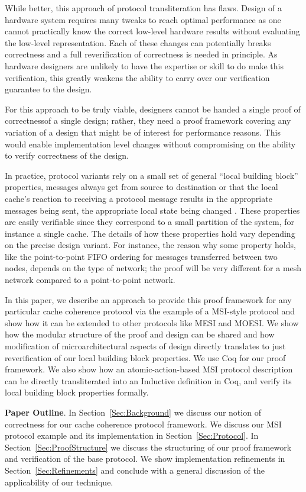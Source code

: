 While better, this approach of protocol transliteration has
flaws. Design of a hardware system requires many tweaks to reach
optimal performance as one cannot practically know the correct
low-level hardware results without evaluating the low-level
representation.  Each of these changes can potentially breaks
correctness and a full reverification of correctness is needed in
principle. As hardware designers are unlikely to have the expertise or
skill to do make this verification, this greatly weakens the ability
to carry over our verification guarantee to the design.

For this approach to be truly viable, designers cannot be handed a
single proof of correctnessof a single design; rather, they need a
proof framework covering any variation of a design that might be of
interest for performance reasons. This would enable implementation
level changes without compromising on the ability to verify
correctness of the design.

In practice, protocol variants rely on a small set of general ``local
building block'' properties, \eg{} messages always get from source to
destination or that the local cache's reaction to receiving a protocol
message results in the appropriate messages being sent, the
appropriate local state being changed \etc{}.  These properties are
easily verifiable since they correspond to a small partition of the
system, for instance a single cache.  The details of how these
properties hold vary depending on the precise design variant. For
instance, the reason why some property holds, like the point-to-point
FIFO ordering for messages transferred between two nodes, depends on
the type of network; the proof will be very different for a mesh
network compared to a point-to-point network.

In this paper, we describe an approach to provide this proof framework
for any particular cache coherence protocol via the example of a
MSI-style protocol and show how it can be extended to other protocols
like MESI and MOESI. We show how the modular structure of the proof
and design can be shared and how modification of microarchitectural
aspects of design directly translates to just reverification of our
local building block properties. We use Coq for our proof
framework. We also show how an atomic-action-based MSI protocol
description can be directly transliterated into an Inductive
definition in Coq, and verify its local building block properties
formally.

\noindent\textbf{Paper Outline}. In Section~\ref{Sec:Background} we
discuss our notion of correctness for our cache coherence protocol
framework. We discuss our MSI protocol example and its implementation
in Section~\ref{Sec:Protocol}. In Section~\ref{Sec:ProofStructure} we discuss
the structuring of our proof framework and verification of the base
protocol. We show implementation refinements in
Section~\ref{Sec:Refinements} and conclude with a general discussion
of the applicability of our technique.
